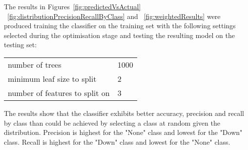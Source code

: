 	The results in Figures~\ref{fig:predictedVsActual} ~\ref{fig:distributionPrecisionRecallByClass} and ~\ref{fig:weightedResults} were produced training the classifier on the training set with the following settings selected during the optimisation stage and testing the resulting model on the testing set:

	\begin{table}[H]
		\begin{tabular}{ll}
			{number of trees} 				& 1000\\
			{minimum leaf size to split}		& 2\\
			{number of features to split on}	& 3\\
		\end{tabular}
	\end{table}

	The results show that the classifier exhibits better accuracy, precision and recall by class than could be achieved by selecting a class at random given the distribution. Precision is highest for the "None" class and lowest for the "Down" class. Recall is highest for the "Down" class and lowest for the "None" class.